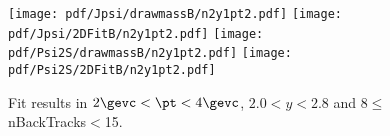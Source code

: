 \begin{figure}[H]
\begin{center}
\texttt{[image: pdf/Jpsi/drawmassB/n2y1pt2.pdf]}
\texttt{[image: pdf/Jpsi/2DFitB/n2y1pt2.pdf]}
\vspace*{-0.5cm}
\texttt{[image: pdf/Psi2S/drawmassB/n2y1pt2.pdf]}
\texttt{[image: pdf/Psi2S/2DFitB/n2y1pt2.pdf]}
\vspace*{-0.5cm}
\end{center}
\caption{Fit results in $2\gevc<\pt<4\gevc$, $2.0<y<2.8$ and 8$\leq$nBackTracks$<$15.}
\label{Fitn2y1pt2}
\end{figure}
